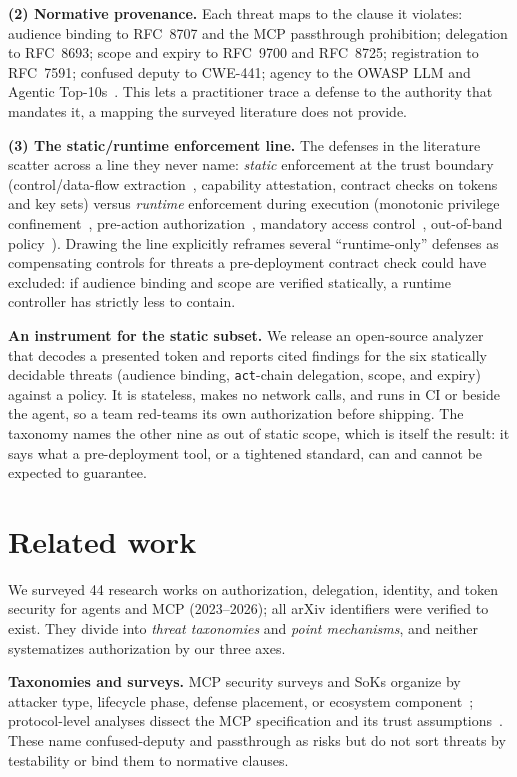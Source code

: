 \noindent\textbf{(2) Normative provenance.} Each threat maps to the clause it
violates: audience binding to RFC~8707 and the MCP passthrough prohibition;
delegation to RFC~8693; scope and expiry to RFC~9700 and RFC~8725; registration to
RFC~7591; confused deputy to CWE-441; agency to the OWASP LLM and Agentic
Top-10s~\cite{owaspllm,owaspagentic}. This lets a practitioner trace a defense to the
authority that mandates it, a mapping the surveyed literature does not provide.

\noindent\textbf{(3) The static/runtime enforcement line.} The defenses in the
literature scatter across a line they never name: \emph{static} enforcement at the
trust boundary (control/data-flow extraction~\cite{agentauth2025camel}, capability
attestation, contract checks on tokens and key sets) versus \emph{runtime}
enforcement during execution (monotonic privilege confinement~\cite{agentauth2025progent},
pre-action authorization~\cite{agentauth2026preaction}, mandatory access
control~\cite{agentauth2026mac}, out-of-band policy~\cite{agentauth2026angels}).
Drawing the line explicitly reframes several ``runtime-only'' defenses as
compensating controls for threats a pre-deployment contract check could have
excluded: if audience binding and scope are verified statically, a runtime
controller has strictly less to contain.

\noindent\textbf{An instrument for the static subset.} We release an open-source
analyzer that decodes a presented token and reports cited findings for the six
statically decidable threats (audience binding, \texttt{act}-chain delegation,
scope, and expiry) against a policy. It is stateless, makes no network calls, and
runs in CI or beside the agent, so a team red-teams its own authorization before
shipping. The taxonomy names the other nine as out of static scope, which is itself
the result: it says what a pre-deployment tool, or a tightened standard, can and
cannot be expected to guarantee.

\section{Related work}\label{sec:related}
We surveyed 44 research works on authorization, delegation, identity, and token
security for agents and MCP (2023--2026); all arXiv identifiers were verified to
exist. They divide into \emph{threat taxonomies} and \emph{point mechanisms}, and
neither systematizes authorization by our three axes.

\noindent\textbf{Taxonomies and surveys.} MCP security surveys and SoKs organize by
attacker type, lifecycle phase, defense placement, or ecosystem
component~\cite{agentauth2025mcplandscape,agentauth2025sokmcp,agentauth2026mcp38,agentauth2026mcpdpt,agentauth2026sokmultiagent};
protocol-level analyses dissect the MCP specification and its trust
assumptions~\cite{agentauth2026breakingprotocol,agentauth2026mcpdesign}. These name
confused-deputy and passthrough as risks but do not sort threats by testability or
bind them to normative clauses.

